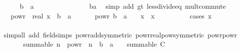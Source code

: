 \begin{isabellebody}
\isanewline
\ \ \ \ \isamarkupfalse%
\ {\isachardoublequoteopen}b\ {\isacharminus}{\kern0pt}\ a\ {\isacharasterisk}{\kern0pt}\ {\isasymgamma}\ {\isachargreater}{\kern0pt}\ {}{\isachardoublequoteclose}\isanewline
\ \ \ \ \ \ \ \ \isamarkupfalse%
\ {\isacartoucheopen}{\isasymgamma}\ {\isasymin}\ {\isacharbraceleft}{\kern0pt}{}{\isacharless}{\kern0pt}{\isachardot}{\kern0pt}{\isachardot}{\kern0pt}{\isacharless}{\kern0pt}b{\isacharslash}{\kern0pt}a{\isacharbraceright}{\kern0pt}{\isacartoucheclose}\ \isamarkupfalse%
\ {\isacharparenleft}{\kern0pt}simp\ add{\isacharcolon}{\kern0pt}\ gt{\isacharunderscore}{\kern0pt}{}{\isacharparenleft}{\kern0pt}{}{\isacharparenright}{\kern0pt}\ less{\isacharunderscore}{\kern0pt}divide{\isacharunderscore}{\kern0pt}eq\ mult{\isachardot}{\kern0pt}commute{\isacharparenright}{\kern0pt}\isanewline
\ \ \ \ \isamarkupfalse%
\ {}{\isacharcolon}{\kern0pt}\ {\isachardoublequoteopen}{}\ powr\ {\isacharparenleft}{\kern0pt}{\isacharminus}{\kern0pt}\ real\ x\ {\isacharasterisk}{\kern0pt}\ {\isacharparenleft}{\kern0pt}b\ {\isacharminus}{\kern0pt}\ a\ {\isacharasterisk}{\kern0pt}\ {\isasymgamma}{\isacharparenright}{\kern0pt}{\isacharparenright}{\kern0pt}\ {\isacharequal}{\kern0pt}\ {\isacharparenleft}{\kern0pt}{}\ {\isacharslash}{\kern0pt}\ {}\ powr\ {\isacharparenleft}{\kern0pt}b\ {\isacharminus}{\kern0pt}\ a\ {\isacharasterisk}{\kern0pt}\ {\isasymgamma}{\isacharparenright}{\kern0pt}{\isacharparenright}{\kern0pt}\ {\isacharcircum}{\kern0pt}\ x{\isachardoublequoteclose}\ \ x\isanewline
\ \ \ \ \ \ \ \ \isamarkupfalse%
\ {\isacharparenleft}{\kern0pt}cases\ {\isachardoublequoteopen}x\ {\isacharequal}{\kern0pt}\ {}{\isachardoublequoteclose}{\isacharparenright}{\kern0pt}\isanewline
\ \ \ \ \ \ \ \ \isamarkupfalse%
\ {\isacharparenleft}{\kern0pt}simp{\isacharunderscore}{\kern0pt}all\ add{\isacharcolon}{\kern0pt}\ field{\isacharunderscore}{\kern0pt}simps\ powr{\isacharunderscore}{\kern0pt}add{\isacharbrackleft}{\kern0pt}symmetric{\isacharbrackright}{\kern0pt}\ powr{\isacharunderscore}{\kern0pt}realpow{\isacharbrackleft}{\kern0pt}symmetric{\isacharbrackright}{\kern0pt}\ powr{\isacharunderscore}{\kern0pt}powr{\isacharparenright}{\kern0pt}\isanewline
\ \ \ \ \isamarkupfalse%
\ {}{\isacharcolon}{\kern0pt}\ {\isachardoublequoteopen}summable\ {\isacharparenleft}{\kern0pt}{\isasymlambda}n{\isachardot}{\kern0pt}\ {}\ powr\ {\isacharparenleft}{\kern0pt}{\isacharminus}{\kern0pt}\ n\ {\isacharasterisk}{\kern0pt}\ {\isacharparenleft}{\kern0pt}b\ {\isacharminus}{\kern0pt}\ a\ {\isacharasterisk}{\kern0pt}\ {\isasymgamma}{\isacharparenright}{\kern0pt}{\isacharparenright}{\kern0pt}{\isacharparenright}{\kern0pt}{\isachardoublequoteclose}\ {\isacharparenleft}{\kern0pt}\ {\isachardoublequoteopen}summable\ {\isacharquery}{\kern0pt}C{\isachardoublequoteclose}{\isacharparenright}{\kern0pt}\isanewline

\end{isabellebody}
